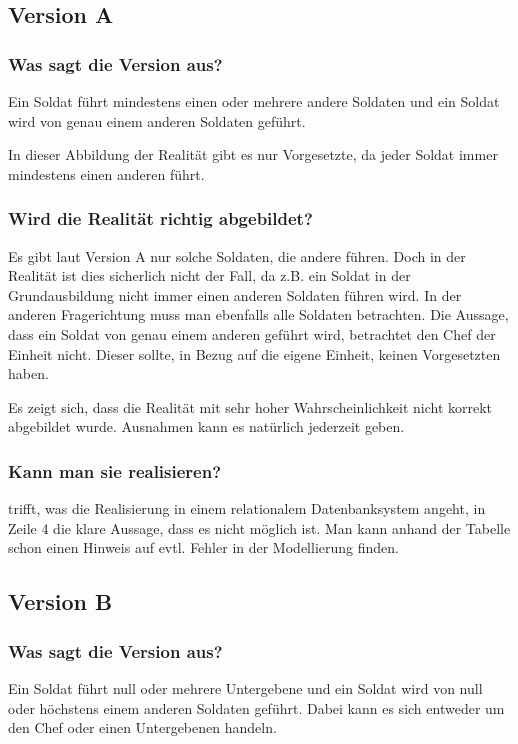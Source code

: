         \subsection{Version A}
          \subsubsection{Was sagt die Version aus?}
            Ein Soldat führt mindestens einen oder mehrere andere Soldaten und ein Soldat wird von genau einem anderen Soldaten geführt.

            In dieser Abbildung der Realität gibt es nur Vorgesetzte, da jeder Soldat immer mindestens einen anderen führt.

          \subsubsection{Wird die Realität richtig abgebildet?}
            Es gibt laut Version A nur solche Soldaten, die andere führen. Doch in der Realität ist dies sicherlich nicht der Fall, da z.B. ein Soldat in der Grundausbildung nicht immer  einen anderen Soldaten führen wird. In der anderen Fragerichtung muss man ebenfalls alle Soldaten betrachten. Die Aussage, dass ein Soldat von genau einem anderen geführt wird, betrachtet den Chef der Einheit nicht. Dieser sollte, in Bezug auf die eigene Einheit, keinen Vorgesetzten haben.

            Es zeigt sich, dass die Realität mit sehr hoher Wahrscheinlichkeit nicht korrekt abgebildet wurde. Ausnahmen kann es natürlich jederzeit geben.
          \subsubsection{Kann man sie realisieren?}
             trifft, was die Realisierung in einem relationalem Datenbanksystem angeht, in Zeile 4 die klare Aussage, dass es nicht möglich ist. Man kann anhand der Tabelle schon einen Hinweis auf evtl. Fehler in der Modellierung finden.
        \subsection{Version B}
          \subsubsection{Was sagt die Version aus?}
            Ein Soldat führt null oder mehrere Untergebene und ein Soldat wird von null oder höchstens einem anderen Soldaten geführt. Dabei kann es sich entweder um den Chef oder einen Untergebenen handeln.

